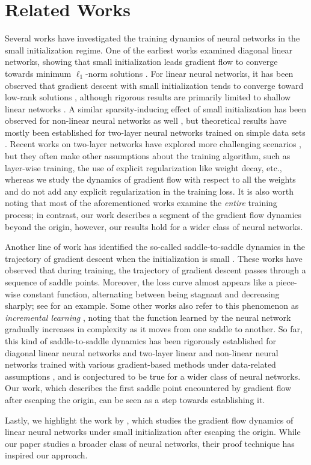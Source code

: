 \section{Related Works}
\label{sec_related_works}
Several works have investigated the training dynamics of neural networks in the small initialization regime. One of the earliest works examined diagonal linear networks, showing that small initialization leads gradient flow to converge towards minimum $\ell_1$-norm solutions \citep{srebro_ib, dln_sparse}. For linear neural networks, it has been observed that gradient descent with small initialization tends to converge toward low-rank solutions \citep{guna_mtx_fct, cohen_mtx_fct}, although rigorous results are primarily limited to shallow linear networks \citep{mahdi_ib, lee_saddle}. A similar sparsity-inducing effect of small initialization has been observed for non-linear neural networks as well \citep{chizat_lazy}, but theoretical results have mostly been established for two-layer neural networks trained on simple data sets \citep{lyu_simp,gf_orth,wang_saddle}. Recent works on two-layer networks have explored more challenging scenarios \citep{damian_reps, abbe_msp, mousavi_sgd}, but they often make other assumptions about the training algorithm, such as layer-wise training, the use of explicit regularization like weight decay, etc., whereas we study the dynamics of gradient flow with respect to all the weights and do not add any explicit regularization in the training loss. It is also worth noting that most of the aforementioned works examine the \emph{entire} training process; in contrast, our work describes a segment of the gradient flow dynamics beyond the origin, however, our results hold for a wider class of neural networks. 

Another line of work has identified the so-called saddle-to-saddle dynamics in the trajectory of gradient descent when the initialization is small \citep{jacot_sd, lyu_resolving}.  These works have observed that during training, the trajectory of gradient descent passes through a sequence of saddle points. Moreover, the loss curve almost appears like a piece-wise constant function, alternating between being stagnant and decreasing sharply; see  for an example. Some other works also refer to this phenomenon as \emph{incremental learning} \citep{gidel_incr, gissin_incr}, noting that the function learned by the neural network gradually increases in complexity as it moves from one saddle to another. So far, this kind of saddle-to-saddle dynamics has been rigorously established for diagonal linear neural networks \citep{pesme_sd, abbe_inc} and two-layer linear and non-linear neural networks trained with various gradient-based methods under data-related assumptions \citep{lee_saddle, gf_orth, wang_saddle, montanari_saddle,abbe_sgd}, and is conjectured to be true for a wider class of neural networks. Our work, which describes the first saddle point encountered by gradient flow after escaping the origin, can be seen as a step towards establishing it.

Lastly, we highlight the work by \cite{lyu_resolving}, which studies the gradient flow dynamics of linear neural networks under small initialization after escaping the origin. While our paper studies a broader class of neural networks, their proof technique has inspired our approach.